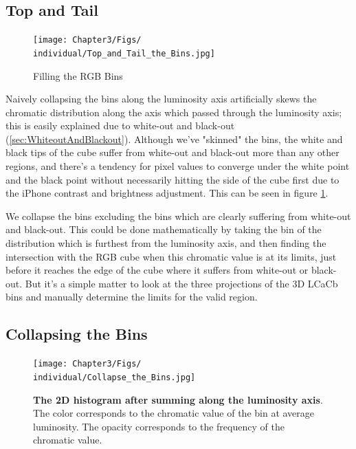 \subsection{Top and Tail}\label{sec:TopAndTail}

\begin{figure}[h!] %
  \centering
    \texttt{[image: Chapter3/Figs/\\individual/Top\_and\_Tail\_the\_Bins.jpg]}
        \caption{Filling the RGB Bins}  \label{fig:Top_and_Tail_the_Bins}
    \end{figure}


Naively collapsing the bins along the luminosity axis artificially skews the chromatic distribution along the axis which passed through the luminosity axis; this is easily explained due to white-out and black-out (\ref{sec:WhiteoutAndBlackout}). 
Although we've "skinned" the bins, the white and black tips of the cube suffer from white-out and black-out more than any other regions, and there's a tendency for pixel values to converge under the white point and the black point without necessarily hitting the side of the cube first due to the iPhone contrast and brightness adjustment. This can be seen in figure   \ref{fig:Top_and_Tail_the_Bins}. 

We collapse the bins excluding the bins which are clearly suffering from white-out and black-out. This could be done mathematically by taking the bin of the distribution which is furthest from the luminosity axis, and then finding the intersection with the RGB cube when this chromatic value is at its limits, just before it reaches the edge of the cube where it suffers from white-out or black-out. But it's a simple matter to look at the three projections of the 3D LCaCb bins and manually determine the limits for the valid region.


\subsection{Collapsing the Bins}\label{sec:CollapsingTheBins}

\begin{figure}[h!]
  \centering
    \texttt{[image: Chapter3/Figs/\\individual/Collapse\_the\_Bins.jpg]}
        \caption{\textbf{The 2D histogram after summing along the luminosity axis}. The color corresponds to the chromatic value of the bin at average luminosity. The opacity corresponds to the frequency of the chromatic value. }  \label{fig:Collapse_the_Bins}
    \end{figure}
    
